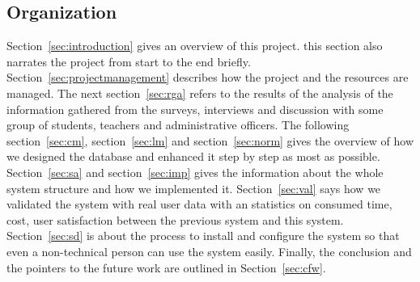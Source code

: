 \subsection{Organization}
Section~\ref{sec:introduction} gives an overview of this project. this section also narrates the project from start to the end briefly. Section~\ref{sec:projectmanagement} describes how the project and the resources are managed. The next section~\ref{sec:rga} refers to the results of the analysis of the information gathered from the surveys, interviews and discussion with some group of students, teachers and administrative officers. The following section~\ref{sec:cm}, section~\ref{sec:lm} and section~\ref{sec:norm} gives the overview of how we designed the database and enhanced it step by step as most as possible. Section~\ref{sec:sa} and section~\ref{sec:imp} gives the information about the whole system structure and how we implemented it. Section~\ref{sec:val} says how we validated the system with real user data with an statistics on consumed time, cost, user satisfaction between the previous system and this system. Section~\ref{sec:sd} is about the process to install and configure the system so that even a non-technical person can use the system easily. Finally, the conclusion and the pointers to the future work are outlined in Section~\ref{sec:cfw}.

\clearpage